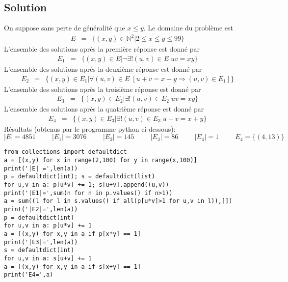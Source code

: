 \documentclass{article}
\newenvironment{solution}{\subsection{Solution}}{\pagebreak}
\begin{document}
\begin{solution}
On suppose sans perte de généralité que $x\leq y$. Le domaine du problème est
\begin{eqnarray*}
E & = & \{(x,y)\in\mathbb{N}^2|2\leq x\leq y\leq 99\}
\end{eqnarray*}
L'ensemble des solutions après la première réponse est donné par
\begin{eqnarray*}
E_1 & = & \{(x,y)\in E|\neg \exists! (u,v)\in E\;uv=xy\}
\end{eqnarray*}
L'ensemble des solutions après la deuxième réponse est donné par
\begin{eqnarray*}
E_2 & = & \{(x,y)\in E_1|\forall(u,v)\in E\;[u+v=x+y\Rightarrow(u,v)\in E_1]\}
\end{eqnarray*}
L'ensemble des solutions après la troisième réponse est donné par
\begin{eqnarray*}
E_3 & = & \{(x,y)\in E_2|\exists! (u,v)\in E_2\;uv=xy\}
\end{eqnarray*}
L'ensemble des solutions après la quatrième réponse est donné par
\begin{eqnarray*}
E_4 & = & \{(x,y)\in E_3|\exists! (u,v)\in E_3\;u+v=x+y\}
\end{eqnarray*}
Résultats (obtenus par le programme python ci-dessous):
\[
|E| = 4851
\hspace{1cm}
|E_1| = 3076
\hspace{1cm}
|E_2| = 145
\hspace{1cm}
|E_3| = 86
\hspace{1cm}
|E_4| = 1
\hspace{1cm}
E_4 = \{(4,13)\}
\]
\begin{verbatim}
from collections import defaultdict
a = [(x,y) for x in range(2,100) for y in range(x,100)]
print('|E| =',len(a))
p = defaultdict(int); s = defaultdict(list)
for u,v in a: p[u*v] += 1; s[u+v].append((u,v))
print('|E1|=',sum(n for n in p.values() if n>1))
a = sum((l for l in s.values() if all(p[u*v]>1 for u,v in l)),[])
print('|E2|=',len(a))
p = defaultdict(int)
for u,v in a: p[u*v] += 1
a = [(x,y) for x,y in a if p[x*y] == 1]
print('|E3|=',len(a))
s = defaultdict(int)
for u,v in a: s[u+v] += 1
a = [(x,y) for x,y in a if s[x+y] == 1]
print('E4=',a)
\end{verbatim}
\end{solution}

\end{document}
